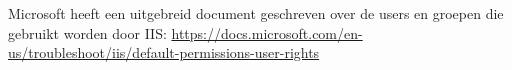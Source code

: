 Microsoft heeft een uitgebreid document geschreven over de users en groepen die gebruikt worden door IIS: \url{https://docs.microsoft.com/en-us/troubleshoot/iis/default-permissions-user-rights}
